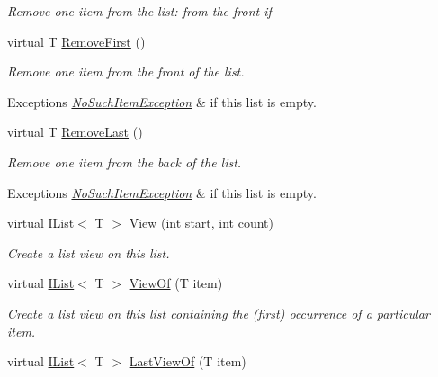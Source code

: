 \begin{DoxyCompactItemize}
\begin{DoxyCompactList}\small\item\em Remove one item from the list\+: from the front if \end{DoxyCompactList}\item 
virtual T \hyperlink{class_c5_1_1_linked_list_a4d86cb509302d7b05a2f2d12bc14c722}{Remove\+First} ()
\begin{DoxyCompactList}\small\item\em Remove one item from the front of the list. 
\begin{DoxyExceptions}{Exceptions}
{\em \hyperlink{class_c5_1_1_no_such_item_exception}{No\+Such\+Item\+Exception}} & if this list is empty. \\
\hline
\end{DoxyExceptions}
\end{DoxyCompactList}\item 
virtual T \hyperlink{class_c5_1_1_linked_list_a66a4322035508335f3b8edff17d5f7c9}{Remove\+Last} ()
\begin{DoxyCompactList}\small\item\em Remove one item from the back of the list. 
\begin{DoxyExceptions}{Exceptions}
{\em \hyperlink{class_c5_1_1_no_such_item_exception}{No\+Such\+Item\+Exception}} & if this list is empty. \\
\hline
\end{DoxyExceptions}
\end{DoxyCompactList}\item 
virtual \hyperlink{interface_c5_1_1_i_list}{I\+List}$<$ T $>$ \hyperlink{class_c5_1_1_linked_list_a484d1df33c1a7e6e75f2eb708b588435}{View} (int start, int count)
\begin{DoxyCompactList}\small\item\em Create a list view on this list. \end{DoxyCompactList}\item 
virtual \hyperlink{interface_c5_1_1_i_list}{I\+List}$<$ T $>$ \hyperlink{class_c5_1_1_linked_list_a419c2c0089d95d73460431f41e60daa9}{View\+Of} (T item)
\begin{DoxyCompactList}\small\item\em Create a list view on this list containing the (first) occurrence of a particular item. \end{DoxyCompactList}\item 
virtual \hyperlink{interface_c5_1_1_i_list}{I\+List}$<$ T $>$ \hyperlink{class_c5_1_1_linked_list_ad1afcf3bee602e7899bebfeaf7b549ad}{Last\+View\+Of} (T item)

\end{DoxyCompactItemize}
